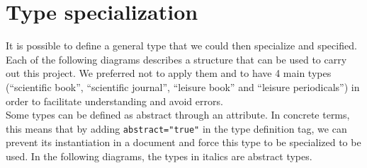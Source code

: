 \documentclass{article}
\begin{document}
\section{Type specialization}
  It is possible to define a general type that we could then specialize and specified. Each of the following diagrams describes a structure that can be used to carry out this project. We preferred not to apply them and to have 4 main types (``scientific book'', ``scientific journal'', ``leisure book'' and ``leisure periodicals'') in order to facilitate understanding and avoid errors.\\
  Some types can be defined as abstract through an attribute.  In concrete terms, this means that by adding \verb|abstract="true"| in the type definition tag, we can prevent its instantiation in a document and force this type to be specialized to be used.
  In the following diagrams, the types in italics are abstract types.
  
\end{document}
